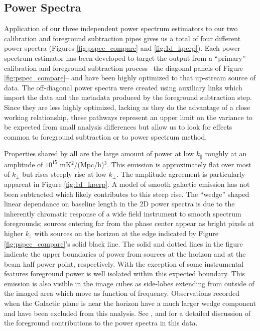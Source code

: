 \documentclass[twolcolumn,iop]{emulateapj}
\begin{document}
\subsection{Power Spectra}
\label{sec:power_spectrum_comparison}
Application of our three independent power spectrum estimators to our two calibration and foreground subtraction pipes gives us a total of four different power spectra (Figures \ref{fig:pspec_compare} and \ref{fig:1d_kperp}).  Each power spectrum estimator has been developed to target the output from a ``primary'' calibration and foreground subtraction process --the diagonal panels of Figure \ref{fig:pspec_compare}-- and have been highly optimized to that up-stream source of data.  The off-diagonal power spectra were created using auxiliary links which import the data and the metadata produced by the foreground subtraction step.  Since they are less highly optimized, lacking as they do the advantage of a close working relationship, these pathways represent an upper limit on the variance to be expected from small analysis differences but allow us to look for effects common to foreground subtraction or to power spectrum method.


Properties shared by all are the large amount of power at low $k_{\parallel}$ roughly at an amplitude of $10^{15}$ mK$^2$/(Mpc/h)$^3$. This emission is approximately flat over most of $k_{\perp}$ but rises steeply rise at low $k_\perp$. The amplitude agreement is particularly apparent in Figure \ref{fig:1d_kperp}. A model of smooth galactic emission has not been subtracted which likely contributes to this steep rise. The ``wedge'' shaped linear dependance on baseline length in the 2D power spectra is due to the inherently chromatic response of a wide field instrument to smooth spectrum foregrounds; sources entering far from the phase center appear as bright pixels at higher $k_\parallel$ with sources on the horizon at the edge indicated by Figure \ref{fig:pspec_compare}'s  solid black line. The solid and dotted lines in the figure indicate the upper boundaries of power from sources at the horizon and at the beam half power point, respectively.  With the exception of some instrumental features foreground power is well isolated within this expected boundary. This emission is also visible in the image cubes as side-lobes extending from outside of the imaged area which move as function of frequency.  Observations recorded when the Galactic plane is near the horizon have a much larger wedge component and have been excluded from this analysis. See \cite{2015ApJ...804...14T}, \cite{2015ApJ...807L..28T} and \cite{Pober:2016ApJ...819....8P} for a detailed discussion of the foreground contributions to the power spectra in this data. 
\end{document}
